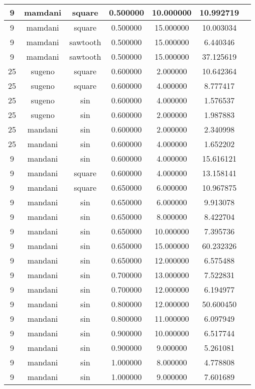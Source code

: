 \begin{tabular}{|c|c|c|c|c|c|c|}
\hline
9 & mamdani & square & 0.500000 & 10.000000 & 10.992719\\
\hline
9 & mamdani & square & 0.500000 & 15.000000 & 10.003034\\
\hline
9 & mamdani & sawtooth & 0.500000 & 15.000000 & 6.440346\\
\hline
9 & mamdani & sawtooth & 0.500000 & 15.000000 & 37.125619\\
\hline
25 & sugeno & square & 0.600000 & 2.000000 & 10.642364\\
\hline
25 & sugeno & square & 0.600000 & 4.000000 & 8.777417\\
\hline
25 & sugeno & sin & 0.600000 & 4.000000 & 1.576537\\
\hline
25 & sugeno & sin & 0.600000 & 2.000000 & 1.987883\\
\hline
25 & mandani & sin & 0.600000 & 2.000000 & 2.340998\\
\hline
25 & mandani & sin & 0.600000 & 4.000000 & 1.652202\\
\hline
9 & mandani & sin & 0.600000 & 4.000000 & 15.616121\\
\hline
9 & mandani & square & 0.600000 & 4.000000 & 13.158141\\
\hline
9 & mandani & square & 0.650000 & 6.000000 & 10.967875\\
\hline
9 & mandani & sin & 0.650000 & 6.000000 & 9.913078\\
\hline
9 & mandani & sin & 0.650000 & 8.000000 & 8.422704\\
\hline
9 & mandani & sin & 0.650000 & 10.000000 & 7.395736\\
\hline
9 & mandani & sin & 0.650000 & 15.000000 & 60.232326\\
\hline
9 & mandani & sin & 0.650000 & 12.000000 & 6.575488\\
\hline
9 & mandani & sin & 0.700000 & 13.000000 & 7.522831\\
\hline
9 & mandani & sin & 0.700000 & 12.000000 & 6.194977\\
\hline
9 & mandani & sin & 0.800000 & 12.000000 & 50.600450\\
\hline
9 & mandani & sin & 0.800000 & 11.000000 & 6.097949\\
\hline
9 & mandani & sin & 0.900000 & 10.000000 & 6.517744\\
\hline
9 & mandani & sin & 0.900000 & 9.000000 & 5.261081\\
\hline
9 & mandani & sin & 1.000000 & 8.000000 & 4.778808\\
\hline
9 & mandani & sin & 1.000000 & 9.000000 & 7.601689\\

\end{tabular}

